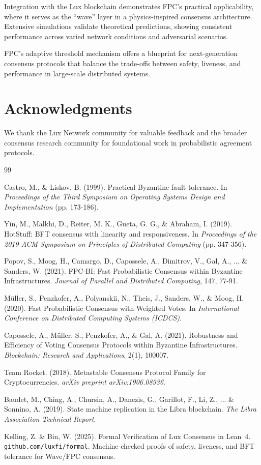 \documentclass[11pt,a4paper]{article}
\begin{document}
Integration with the Lux blockchain demonstrates FPC's practical applicability, where it serves as the ``wave'' layer in a physics-inspired consensus architecture. Extensive simulations validate theoretical predictions, showing consistent performance across varied network conditions and adversarial scenarios.

FPC's adaptive threshold mechanism offers a blueprint for next-generation consensus protocols that balance the trade-offs between safety, liveness, and performance in large-scale distributed systems.

\section*{Acknowledgments}

We thank the Lux Network community for valuable feedback and the broader consensus research community for foundational work in probabilistic agreement protocols.

\begin{thebibliography}{99}

Castro, M., \& Liskov, B. (1999). Practical Byzantine fault tolerance. In \textit{Proceedings of the Third Symposium on Operating Systems Design and Implementation} (pp. 173-186).

Yin, M., Malkhi, D., Reiter, M. K., Gueta, G. G., \& Abraham, I. (2019). HotStuff: BFT consensus with linearity and responsiveness. In \textit{Proceedings of the 2019 ACM Symposium on Principles of Distributed Computing} (pp. 347-356).

Popov, S., Moog, H., Camargo, D., Capossele, A., Dimitrov, V., Gal, A., ... \& Sanders, W. (2021). FPC-BI: Fast Probabilistic Consensus within Byzantine Infrastructures. \textit{Journal of Parallel and Distributed Computing}, 147, 77-91.

Müller, S., Penzkofer, A., Polyanskii, N., Theis, J., Sanders, W., \& Moog, H. (2020). Fast Probabilistic Consensus with Weighted Votes. In \textit{International Conference on Distributed Computing Systems (ICDCS)}.

Capossele, A., Müller, S., Penzkofer, A., \& Gal, A. (2021). Robustness and Efficiency of Voting Consensus Protocols within Byzantine Infrastructures. \textit{Blockchain: Research and Applications}, 2(1), 100007.

Team Rocket. (2018). Metastable Consensus Protocol Family for Cryptocurrencies. \textit{arXiv preprint arXiv:1906.08936}.

Baudet, M., Ching, A., Chursin, A., Danezis, G., Garillot, F., Li, Z., ... \& Sonnino, A. (2019). State machine replication in the Libra blockchain. \textit{The Libra Association Technical Report}.

Kelling, Z. \& Bin, W. (2025). Formal Verification of Lux Consensus in Lean~4. \texttt{github.com/luxfi/formal}. Machine-checked proofs of safety, liveness, and BFT tolerance for Wave/FPC consensus.

\end{thebibliography}
\end{document}
